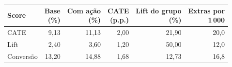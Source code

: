 \begin{tabular}{lrrrrr}
\toprule
Score & \shortstack{Base\\(\%)} & \shortstack{Com ação\\(\%)} & \shortstack{CATE\\(p.p.)} & \shortstack{Lift do grupo\\(\%)} & \shortstack{Extras por\\1\,000} \\
\midrule
CATE & 9,13 & 11,13 & 2,00 & 21,90 & 20,0 \\
Lift & 2,40 & 3,60 & 1,20 & 50,00 & 12,0 \\
Conversão & 13,20 & 14,88 & 1,68 & 12,73 & 16,8 \\
\bottomrule
\end{tabular}

